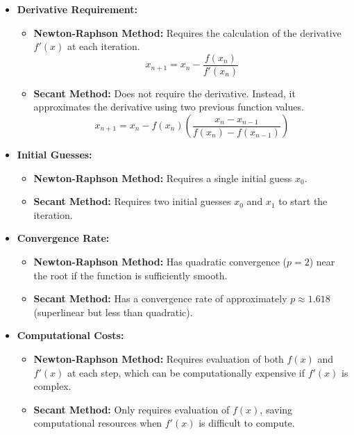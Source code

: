\documentclass[12pt]{article}
\begin{document}
\begin{itemize}
    \item \textbf{Derivative Requirement:}
    \begin{itemize}
        \item \textbf{Newton-Raphson Method:} Requires the calculation of the derivative \( f'(x) \) at each iteration.
        \[
        x_{n+1} = x_n - \frac{f(x_n)}{f'(x_n)}
        \]
        \item \textbf{Secant Method:} Does not require the derivative. Instead, it approximates the derivative using two previous function values.
        \[
        x_{n+1} = x_n - f(x_n) \left( \frac{x_n - x_{n-1}}{f(x_n) - f(x_{n-1})} \right)
        \]
    \end{itemize}
    
    \item \textbf{Initial Guesses:}
    \begin{itemize}
        \item \textbf{Newton-Raphson Method:} Requires a single initial guess \( x_0 \).
        \item \textbf{Secant Method:} Requires two initial guesses \( x_0 \) and \( x_1 \) to start the iteration.
    \end{itemize}

    \item \textbf{Convergence Rate:}
    \begin{itemize}
        \item \textbf{Newton-Raphson Method:} Has quadratic convergence (\( p = 2 \)) near the root if the function is sufficiently smooth.
        \item \textbf{Secant Method:} Has a convergence rate of approximately \( p \approx 1.618 \) (superlinear but less than quadratic).
    \end{itemize}

    \item \textbf{Computational Costs:}
    \begin{itemize}
        \item \textbf{Newton-Raphson Method:} Requires evaluation of both \( f(x) \) and \( f'(x) \) at each step, which can be computationally expensive if \( f'(x) \) is complex.
        \item \textbf{Secant Method:} Only requires evaluation of \( f(x) \), saving computational resources when \( f'(x) \) is difficult to compute.
    \end{itemize}
\end{itemize}
\end{document}
